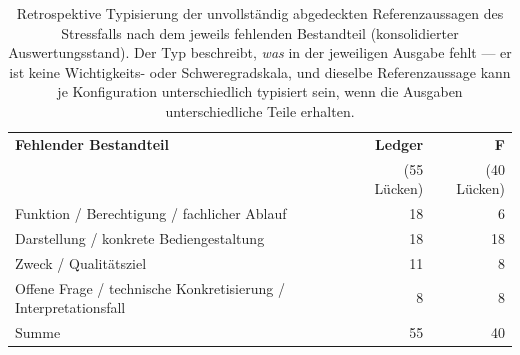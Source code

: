 
\begin{table}[htbp]
  \centering
  \small
  \begin{tabular}{>{\raggedright\arraybackslash}p{}rr}
    \hline
    \textbf{Fehlender Bestandteil} & \textbf{Ledger} & \textbf{F} \\
    & (55 Lücken) & (40 Lücken) \\
    \hline
    Funktion / Berechtigung / fachlicher Ablauf & 18 & 6 \\
    Darstellung / konkrete Bediengestaltung & 18 & 18 \\
    Zweck / Qualitätsziel & 11 & 8 \\
    Offene Frage / technische Konkretisierung / Interpretationsfall & 8 & 8 \\
    \hline
    Summe & 55 & 40 \\
    \hline
  \end{tabular}
  \caption[Typisierung der Abdeckungslücken im Stressfall]{Retrospektive Typisierung der unvollständig abgedeckten
    Referenzaussagen des Stressfalls nach dem jeweils fehlenden
    Bestandteil (konsolidierter Auswertungsstand). Der Typ
    beschreibt, \emph{was} in der jeweiligen Ausgabe fehlt --- er
    ist keine Wichtigkeits- oder Schweregradskala, und dieselbe
    Referenzaussage kann je Konfiguration unterschiedlich typisiert
    sein, wenn die Ausgaben unterschiedliche Teile erhalten.}
  \label{t:eval-lueckentypen}
\end{table}
